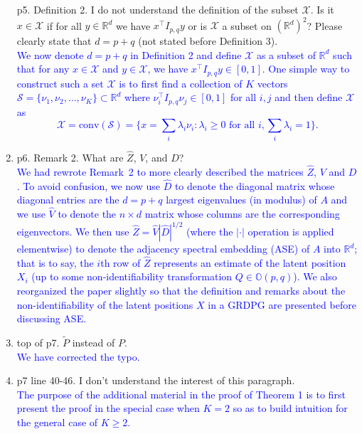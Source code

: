 \documentclass[
]{article}
\begin{document}
\begin{enumerate}
  p5. Definition 2. I do not understand the definition of the subset
  \(\mathcal{X}\). Is it \(x \in \mathcal{X}\) if for all
  \(y \in \mathbb{R}^d\) we have \(x^\top I_{p,q} y\) or is
  \(\mathcal{X}\) a subset on \((\mathbb{R}^d)^2\)? Please clearly state
  that \(d = p + q\) (not stated before Definition 3).\\
  \textcolor{blue}{
  We now denote $d = p + q$ in Definition 2 and define $\mathcal{X}$ as a subset of $\mathbb{R}^{d}$ such
  that for any $x \in \mathcal{X}$ and $y \in \mathcal{X}$, we have
  $x^{\top} I_{p,q} y \in [0,1]$. One simple way to construct such a set
  $\mathcal{X}$ is to first find a collection of $K$ vectors
  $\mathcal{S} = \{\nu_1, \nu_2, \dots, \nu_K\} \subset \mathbb{R}^{d}$
  where $\nu_i^{\top} I_{p,q} \nu_j \in [0,1]$ for all $i,j$ and then define $\mathcal{X}$
  as 
  $$\mathcal{X} = \mathrm{conv}(\mathcal{S}) = \{x = \sum_{i} \lambda_i \nu_i \colon \lambda_i \geq 0 \,\, \text{for all $i$}, \sum_{i} \lambda_i =
  1\}.$$
  }
\item
  p6. Remark 2. What are \(\hat{Z}\), \(V\), and \(D\)?\\
  \textcolor{blue}{
  We had rewrote Remark~2 to more clearly described the matrices
  $\hat{Z}$, $V$ and $D$. To avoid confusion, we now use $\hat{D}$ to
  denote the diagonal matrix whose diagonal entries are the $d = p + q$
  largest eigenvalues (in modulus) of $A$ and we use $\hat{V}$ to denote
  the $n \times d$ matrix whose columns are the corresponding
  eigenvectors. We then use $\hat{Z} = \hat{V} |\hat{D}|^{1/2}$ (where
  the $|\cdot|$ operation is applied elementwise) to denote the
  adjacency spectral embedding (ASE) of $A$ into $\mathbb{R}^{d}$; that is
  to say, the $i$th row of $\hat{Z}$ represents an estimate of the
  latent position $X_i$ (up to some non-identifiability transformation
  $Q \in \mathbb{O}(p,q)$). We also reorganized the paper slightly so
  that the definition and remarks about the non-identifiability of the
  latent positions $X$ in a GRDPG are presented before discussing ASE. }
\item
  top of p7. \(\tilde{P}\) instead of \({P}\).\\
  \textcolor{blue}{
  We have corrected the typo. 
  }
\item
  p7 line 40-46. I don't understand the interest of this paragraph.\\
  \textcolor{blue}{
  The purpose of the additional material in the proof of Theorem 1 is to
  first present the proof in the special case when $K = 2$ so as to
  build intuition for the general case of $K \geq 2$. 
}
\end{enumerate}
\end{document}
